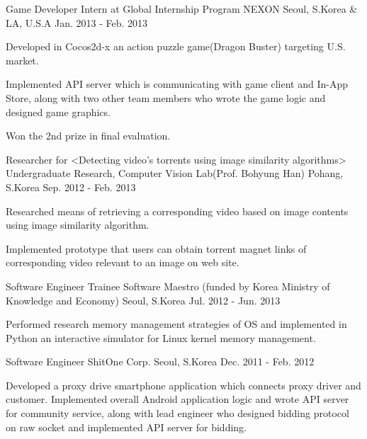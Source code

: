 \begin{cventries}
  \cventry
    {Game Developer Intern at Global Internship Program} %
    {NEXON} %
    {Seoul, S.Korea \& LA, U.S.A} %
    {Jan. 2013 - Feb. 2013} %
    {
      \begin{cvitems} %
        \item {Developed in Cocos2d-x an action puzzle game(Dragon Buster) targeting U.S. market.}
        \item {Implemented API server which is communicating with game client and In-App Store, along with two other team members who wrote the game logic and designed game graphics.}
        \item {Won the 2nd prize in final evaluation.}
      \end{cvitems}
    }
    {}

  \cventry
    {Researcher for <Detecting video’s torrents using image similarity algorithms>} %
    {Undergraduate Research, Computer Vision Lab(Prof. Bohyung Han)} %
    {Pohang, S.Korea} %
    {Sep. 2012 - Feb. 2013} %
    {
      \begin{cvitems} %
        \item {Researched means of retrieving a corresponding video based on image contents using image similarity algorithm.}
        \item {Implemented prototype that users can obtain torrent magnet links of corresponding video relevant to an image on web site.}
      \end{cvitems}
    }
    {}

  \cventry
    {Software Engineer Trainee} %
    {Software Maestro (funded by Korea Ministry of Knowledge and Economy)} %
    {Seoul, S.Korea} %
    {Jul. 2012 - Jun. 2013} %
    {
      \begin{cvitems} %
        \item {Performed research memory management strategies of OS and implemented in Python an interactive simulator for Linux kernel memory management.}
      \end{cvitems}
    }
    {}

  \cventry
    {Software Engineer} %
    {ShitOne Corp.} %
    {Seoul, S.Korea} %
    {Dec. 2011 - Feb. 2012} %
    {
      \begin{cvitems} %
        \item {Developed a proxy drive smartphone application which connects proxy driver and customer. Implemented overall Android application logic and wrote API server for community service, along with lead engineer who designed bidding protocol on raw socket and implemented API server for bidding.}
      \end{cvitems}
    }
    {}


\end{cventries}
